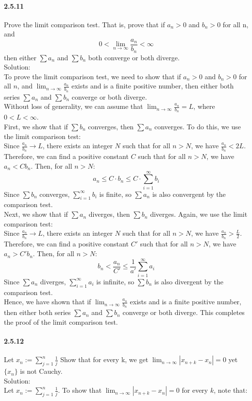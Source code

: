 \documentclass{article}
\begin{document}
\paragraph{2.5.11}
Prove the limit comparison test. That is, prove that if $a_n > 0$ and $b_n > 0$ for all n, and
$$0<\lim_{n\to \infty}\frac{a_n}{b_n}<\infty$$
then either $\sum a_n$ and $\sum b_n$ both converge or both diverge.\\
Solution:\\
To prove the limit comparison test, we need to show that if $a_n > 0$ and $b_n > 0$ for all $n$, and $\lim_{n\to\infty}\frac{a_n}{b_n}$ exists and is a finite positive number, then either both series $\sum a_n$ and $\sum b_n$ converge or both diverge.\\
Without loss of generality, we can assume that $\lim_{n\to\infty}\frac{a_n}{b_n}=L$, where $0<L<\infty$.\\
First, we show that if $\sum b_n$ converges, then $\sum a_n$ converges. To do this, we use the limit comparison test:\\
Since $\frac{a_n}{b_n}\to L$, there exists an integer $N$ such that for all $n>N$, we have $\frac{a_n}{b_n} < 2L$. Therefore, we can find a positive constant $C$ such that for all $n>N$, we have $a_n < Cb_n$. Then, for all $n>N$:
$$a_n\leq C\cdot b_n \leq C\cdot \sum_{i=1}^{\infty}b_i$$
Since $\sum b_n$ converges, $\sum_{i=1}^{\infty}b_i$ is finite, so $\sum a_n$ is also convergent by the comparison test.\\
Next, we show that if $\sum a_n$ diverges, then $\sum b_n$ diverges. Again, we use the limit comparison test:\\
Since $\frac{a_n}{b_n}\to L$, there exists an integer $N$ such that for all $n>N$, we have $\frac{a_n}{b_n} > \frac{L}{2}$. Therefore, we can find a positive constant $C'$ such that for all $n>N$, we have $a_n > C'b_n$. Then, for all $n>N$:
$$b_n < \frac{a_n}{C'}\leq \frac{1}{a'}\sum_{i=1}^{\infty}a_i$$
Since $\sum a_n$ diverges, $\sum_{i=1}^{\infty}a_i$ is infinite, so $\sum b_n$ is also divergent by the comparison test.\\
Hence, we have shown that if $\lim_{n\to\infty}\frac{a_n}{b_n}$ exists and is a finite positive number, then either both series $\sum a_n$ and $\sum b_n$ converge or both diverge. This completes the proof of the limit comparison test.
\paragraph{2.5.12}
Let $x_n:=\sum_{j=1}^{n}\frac{1}{j}$ Show that for every k, we get $\lim_{n\to \infty}|x_{n+k}-x_n|=0$ yet $\{x_n\}$ is not Cauchy.\\
Solution:\\
Let $x_n := \sum_{j=1}^{n}\frac{1}{j}$. To show that $\lim_{n\to \infty}|x_{n+k}-x_n|=0$ for every $k$, note that:
\end{document}
